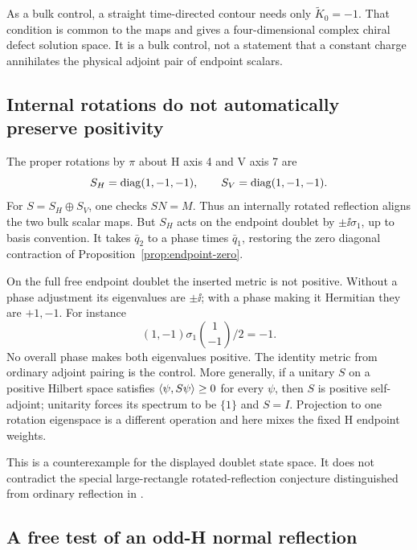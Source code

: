 As a bulk control, a straight time-directed contour needs only
$\widetilde K_0=-1$. That condition is common to the maps and gives
a four-dimensional complex chiral defect solution space. It is a
bulk control, not a statement that a constant charge annihilates
the physical adjoint pair of endpoint scalars.

\subsection{Internal rotations do not automatically preserve positivity}

The proper rotations by $\pi$ about H axis 4 and V axis 7 are
\begin{equation}
 S_H=\operatorname{diag}(1,-1,-1),\qquad S_V=\operatorname{diag}(1,-1,-1).
\end{equation}
For $S=S_H\oplus S_V$, one checks $SN=M$. Thus an internally rotated
reflection aligns the two bulk scalar maps. But $S_H$ acts on the
endpoint doublet by $\pm\ii\sigma_1$, up to basis convention. It
takes $\bar q_2$ to a phase times $\bar q_1$, restoring the zero
diagonal contraction of Proposition~\ref{prop:endpoint-zero}.

On the full free endpoint doublet the inserted metric is not positive.
Without a phase adjustment its eigenvalues are $\pm\ii$; with a phase
making it Hermitian they are $+1,-1$. For instance
\begin{equation}
 (1,-1)\sigma_1\binom{1}{-1}/2=-1.
\end{equation}
No overall phase makes both eigenvalues positive. The identity metric
from ordinary adjoint pairing is the control. More generally, if a
unitary $S$ on a positive Hilbert space satisfies
$\left\langle\psi,S\psi\right\rangle\geq0$ for every $\psi$, then $S$ is positive
self-adjoint; unitarity forces its spectrum to be $\{1\}$ and $S=I$.
Projection to one rotation eigenspace is a different operation and
here mixes the fixed H endpoint weights.

This is a counterexample for the displayed doublet state space.
It does not contradict the special large-rectangle rotated-reflection
conjecture distinguished from ordinary reflection in
\cite[eqs.~(11)--(16)]{DP}.

\subsection{A free test of an odd-H normal reflection}


